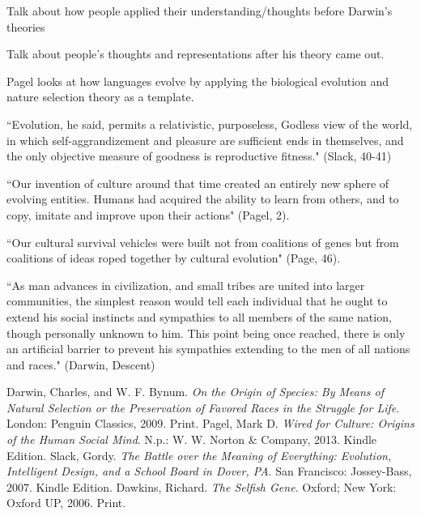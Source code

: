 \documentclass[11pt, oneside]{article}
\begin{document}
\par Talk about how people applied their understanding/thoughts before Darwin's theories



% 

\par Talk about people's thoughts and representations after his theory came out.

\par Pagel looks at how languages evolve by applying the biological evolution and nature selection theory as a template. 

``Evolution, he said, permits a relativistic, purposeless, Godless view of the world, in which self-aggrandizement and pleasure are sufficient ends in themselves, and the only objective measure of goodness is reproductive fitness." (Slack, 40-41)

``Our invention of culture around that time created an entirely new sphere of evolving entities. Humans had acquired the ability to learn from others, and to copy, imitate and improve upon their actions" (Pagel, 2).

``Our cultural survival vehicles were built not from coalitions of genes but from coalitions of ideas roped together by cultural evolution" (Page, 46).

``As man advances in civilization, and small tribes are united into larger communities, the simplest reason would tell each individual that he ought to extend his social instincts and sympathies to all members of the same nation, though personally unknown to him. This point being once reached, there is only an artificial barrier to prevent his sympathies extending to the men of all nations and races." (Darwin, Descent)

\begin{thebibliography}{9}
	Darwin, Charles, and W. F. Bynum.
	\emph{On the Origin of Species: By Means of Natural Selection or the Preservation of Favored Races in the Struggle for Life}.
	London: Penguin Classics, 2009.
	Print.
	Pagel, Mark D. 
	\emph{Wired for Culture: Origins of the Human Social Mind}. 
	N.p.: W. W. Norton \& Company, 2013. 
	Kindle Edition. 
	Slack, Gordy. 
	\emph{The Battle over the Meaning of Everything: Evolution, Intelligent Design, and a School Board in Dover, PA}.
	San Francisco: Jossey-Bass, 2007. 
	Kindle Edition.
	Dawkins, Richard. 
	\emph{The Selfish Gene}.
	Oxford; New York: Oxford UP, 2006. 
	Print.
\end{thebibliography}
\end{document}
